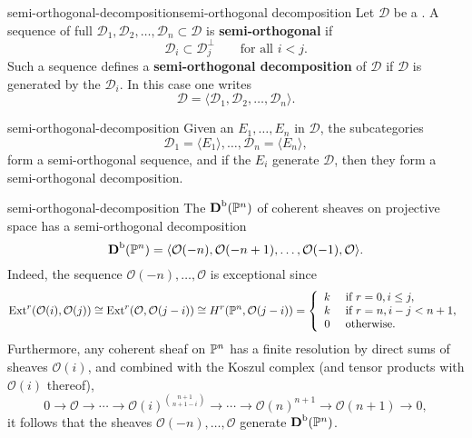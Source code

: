\begin{topic}{semi-orthogonal-decomposition}{semi-orthogonal decomposition}
    Let $\mathcal{D}$ be a . A sequence of full   $\mathcal{D}_1, \mathcal{D}_2, \ldots, \mathcal{D}_n \subset \mathcal{D}$ is \textbf{semi-orthogonal} if
    \[ \mathcal{D}_i \subset \mathcal{D}_j^\perp \qquad \text{for all $i < j$}. \]
    Such a sequence defines a \textbf{semi-orthogonal decomposition} of $\mathcal{D}$ if $\mathcal{D}$ is generated by the $\mathcal{D}_i$. In this case one writes
    \[ \mathcal{D} = \langle \mathcal{D}_1, \mathcal{D}_2, \ldots, \mathcal{D}_n \rangle . \]
\end{topic}

\begin{example}{semi-orthogonal-decomposition}
    Given an  $E_1, \ldots, E_n$ in $\mathcal{D}$, the subcategories
    \[ \mathcal{D}_1 = \langle E_1 \rangle, \ldots, \mathcal{D}_n = \langle E_n \rangle , \]
    form a semi-orthogonal sequence, and if the $E_i$ generate $\mathcal{D}$, then they form a semi-orthogonal decomposition.
\end{example}

\begin{example}{semi-orthogonal-decomposition}
    The  $\textbf{D}^\textup{b}(\mathbb{P}^n)$ of coherent sheaves on projective space has a semi-orthogonal decomposition
    \[ \textbf{D}^\textup{b}(\mathbb{P}^n) = \langle \mathcal{O}(-n), \mathcal{O}(-n + 1), \ldots, \mathcal{O}(-1), \mathcal{O} \rangle . \]
    Indeed, the sequence $\mathcal{O}(-n), \ldots, \mathcal{O}$ is exceptional since
    \[ \textup{Ext}^r(\mathcal{O}(i), \mathcal{O}(j)) \cong \textup{Ext}^r(\mathcal{O}, \mathcal{O}(j - i)) \cong H^r(\mathbb{P}^n, \mathcal{O}(j - i)) = \left\{ \begin{array}{cl}
         k & \textup{ if } r = 0, i \le j , \\
         k & \textup{ if } r = n, i - j < n + 1 , \\
         0 & \textup{ otherwise}.
    \end{array} \right. \]
    Furthermore, any coherent sheaf on $\mathbb{P}^n$ has a finite resolution by direct sums of sheaves $\mathcal{O}(i)$, and combined with the Koszul complex (and tensor products with $\mathcal{O}(i)$ thereof),
    \[ 0 \to \mathcal{O} \to \cdots \to \mathcal{O}(i)^{\binom{n + 1}{n + 1 - i}} \to \cdots \to \mathcal{O}(n)^{n + 1} \to \mathcal{O}(n + 1) \to 0 , \]
    it follows that the sheaves $\mathcal{O}(-n), \ldots, \mathcal{O}$ generate $\textbf{D}^\textup{b}(\mathbb{P}^n)$.
\end{example}

